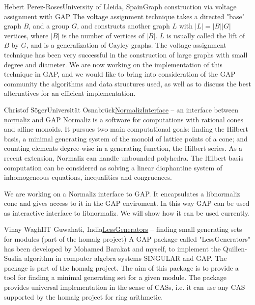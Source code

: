 \documentclass[12pt,a4paper]{article}
\begin{document}
\begin{Abstract}{Hebert Perez-Roses}{University of Lleida, Spain}{Graph construction via voltage assignment with GAP}
The voltage assignment technique takes a directed "base" graph $B$, and a
group $G$, and constructs another graph $L$ with $|L|=|B||G|$ vertices, where
$|B|$ is the number of vertices of $|B|$. $L$ is usually called the lift of $B$
by $G$, and is a generalization of Cayley graphs. The voltage assignment
technique has been very successful in the construction of large graphs
with small degree and diameter. We are now working on the implementation
of this technique in GAP, and we would like to bring into consideration
of the GAP community the algorithms and data structures used, as well as
to discuss the best alternatives for an efficient implementation.
\end{Abstract}


\begin{Abstract}{Christof Söger}{Universität Osnabrück}{\href{https://github.com/fingolfin/NormalizInterface}{NormalizInterface} -- an interface between \href{http://www.math.uos.de/normaliz}{normaliz} and GAP}
Normaliz is a software for computations with rational cones and affine
monoids. It pursues two main computational goals: finding the Hilbert
basis, a minimal generating system of the monoid of lattice points of a
cone; and counting elements degree-wise in a generating function, the
Hilbert series. As a recent extension, Normaliz can handle unbounded
polyhedra. The Hilbert basis computation can be considered as solving a
linear diophantine system of inhomogeneous equations, inequalities and
congruences.

We are working on a Normaliz interface to GAP. It encapsulates a
libnormaliz cone and gives access to it in the GAP enviroment. In this
way GAP can be used as interactive interface to libnormaliz. We will
show how it can be used currently.
\end{Abstract}


\begin{Abstract}{Vinay Wagh}{IIT Guwahati, India}{\href{https://github.com/homalg-project/LessGenerators}{LessGenerators} -- finding small generating sets for modules (part of the homalg project)}
A GAP package called "LessGenerators" has been developed by Mohamed
Barakat and myself, to implement the Quillen-Suslin algorithm in
computer algebra systems SINGULAR and GAP. The package is part of the
homalg project. The aim of this package is to provide a tool for finding
a minimal generating set for a given module. The package provides
universal implementation in the sense of CASs, i.e. it can use any CAS
supported by the homalg project for ring arithmetic.
\end{Abstract}
\end{document}
